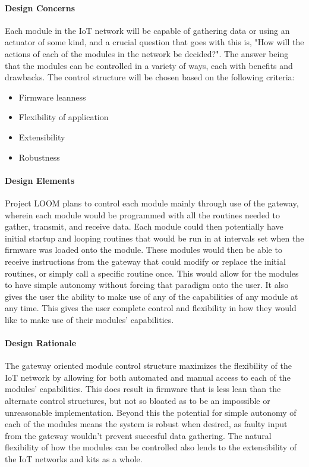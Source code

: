 \documentclass[onecolumn, draftclsnofoot,10pt, compsoc]{IEEEtran}
\begin{document}
\paragraph{Design Concerns}
    Each module in the IoT network will be capable of gathering data or using an actuator of some kind, and a crucial question that goes with this is, "How will the actions of each of the modules in the network be decided?". The answer being that the modules can be controlled in a variety of ways, each with benefits and drawbacks. The control structure will be chosen based on the following criteria:
    \begin{itemize}[noitemsep,topsep=-10pt]
        \item Firmware leanness
        \item Flexibility of application
        \item Extensibility
        \item Robustness
    \end{itemize}

\paragraph{Design Elements}
    Project LOOM plans to control each module mainly through use of the gateway, wherein each module would be programmed with all the routines needed to gather, transmit, and receive data. Each module could then potentially have initial startup and looping routines that would be run in at intervals set when the firmware was loaded onto the module. These modules would then be able to receive instructions from the gateway that could modify or replace the initial routines, or simply call a specific routine once. This would allow for the modules to have simple autonomy without forcing that paradigm onto the user. It also gives the user the ability to make use of any of the capabilities of any module at any time. This gives the user complete control and flexibility in how they would like to make use of their modules' capabilities.

\paragraph{Design Rationale}
    The gateway oriented module control structure maximizes the flexibility of the IoT network by allowing for both automated and manual access to each of the modules' capabilities. This does result in firmware that is less lean than the alternate control structures, but not so bloated as to be an impossible or unreasonable implementation. Beyond this the potential for simple autonomy of each of the modules means the system is robust when desired, as faulty input from the gateway wouldn't prevent succesful data gathering. The natural flexibility of how the modules can be controlled also lends to the extensibility of the IoT networks and kits as a whole. 
\end{document}
